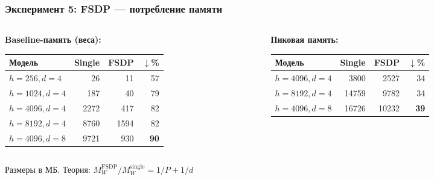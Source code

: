 \begin{frame}
\frametitle{Эксперимент 5: FSDP --- потребление памяти}

\begin{columns}[T]
\begin{column}{0.48\textwidth}
\textbf{Baseline-память (веса):}

\scriptsize
\begin{tabular}{lrrr}
\hline
\textbf{Модель} & \textbf{Single} & \textbf{FSDP} & \textbf{$\downarrow$\%} \\
\hline
$h{=}256, d{=}4$  & 26 & 11 & 57 \\
$h{=}1024, d{=}4$ & 187 & 40 & 79 \\
$h{=}4096, d{=}4$ & 2272 & 417 & 82 \\
$h{=}8192, d{=}4$ & 8760 & 1594 & 82 \\
$h{=}4096, d{=}8$ & 9721 & 930 & \textbf{90} \\
\hline
\end{tabular}
\normalsize
\end{column}

\begin{column}{0.48\textwidth}
\textbf{Пиковая память:}

\scriptsize
\begin{tabular}{lrrr}
\hline
\textbf{Модель} & \textbf{Single} & \textbf{FSDP} & \textbf{$\downarrow$\%} \\
\hline
$h{=}4096, d{=}4$  & 3800 & 2527 & 34 \\
$h{=}8192, d{=}4$  & 14759 & 9782 & 34 \\
$h{=}4096, d{=}8$  & 16726 & 10232 & \textbf{39} \\
\hline
\end{tabular}
\normalsize
\end{column}
\end{columns}

\vspace{0.3cm}

Размеры в МБ. Теория: $M_W^{\text{FSDP}}/M_W^{\text{single}} = 1/P + 1/d$

\end{frame}


